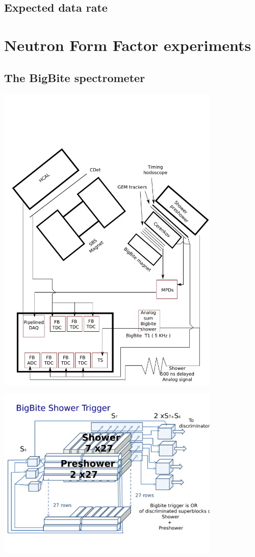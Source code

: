 \documentclass{article}
\begin{document}
\subsection{Expected data rate}
        
\section {Neutron Form Factor experiments}
\subsection {The BigBite spectrometer}

\includegraphics[width=0.8\textwidth]{figs/GeNlayout.pdf}

\includegraphics[width=0.8\textwidth]{figs/BBETrig3D.pdf}
\end{document}
